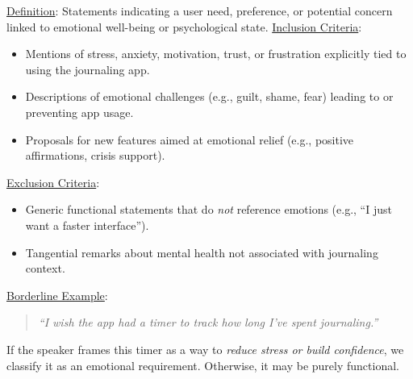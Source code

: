 \documentclass[acmsmall]{acmart}
\begin{document}
\begin{description}[leftmargin=1.5em,itemsep=4pt]
\item[\textbf{Emotional Requirements (ER)}]
\underline{Definition}: Statements indicating a user need, preference, or potential concern linked to emotional well-being or psychological state.
\newline
\underline{Inclusion Criteria}:
\begin{itemize}
  \item Mentions of stress, anxiety, motivation, trust, or frustration explicitly tied to using the journaling app.
  \item Descriptions of emotional challenges (e.g., guilt, shame, fear) leading to or preventing app usage.
  \item Proposals for new features aimed at emotional relief (e.g., positive affirmations, crisis support).
\end{itemize}
\underline{Exclusion Criteria}:
\begin{itemize}
  \item Generic functional statements that do \emph{not} reference emotions (e.g., “I just want a faster interface”).
  \item Tangential remarks about mental health not associated with journaling context.
\end{itemize}
\underline{Borderline Example}:
\begin{quote}
\emph{“I wish the app had a timer to track how long I’ve spent journaling.”}
\end{quote}
If the speaker frames this timer as a way to \emph{reduce stress or build confidence}, we classify it as an emotional requirement. Otherwise, it may be purely functional.


\end{description}
\end{document}
